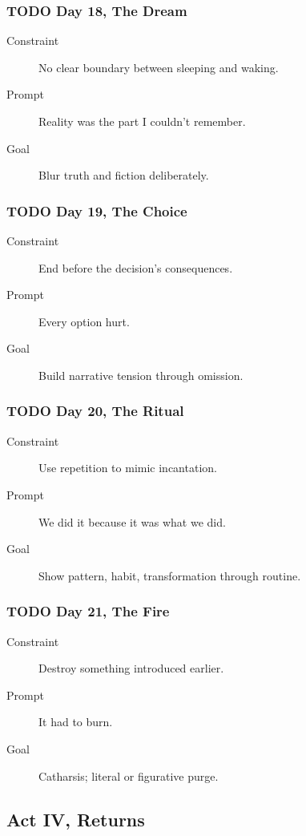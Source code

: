 \documentclass[11pt]{article}
\begin{document}
\subsubsection*{{\bfseries\sffamily TODO} Day 18, The Dream}
\label{sec:org8f648e4}
\begin{description}
\item[{Constraint}] No clear boundary between sleeping and waking.
\item[{Prompt}] Reality was the part I couldn’t remember.
\item[{Goal}] Blur truth and fiction deliberately.
\end{description}
\subsubsection*{{\bfseries\sffamily TODO} Day 19, The Choice}
\label{sec:org90b3529}
\begin{description}
\item[{Constraint}] End before the decision’s consequences.
\item[{Prompt}] Every option hurt.
\item[{Goal}] Build narrative tension through omission.
\end{description}
\subsubsection*{{\bfseries\sffamily TODO} Day 20, The Ritual}
\label{sec:org96d0e49}
\begin{description}
\item[{Constraint}] Use repetition to mimic incantation.
\item[{Prompt}] We did it because it was what we did.
\item[{Goal}] Show pattern, habit, transformation through routine.
\end{description}
\subsubsection*{{\bfseries\sffamily TODO} Day 21, The Fire}
\label{sec:orgb6f3f8d}
\begin{description}
\item[{Constraint}] Destroy something introduced earlier.
\item[{Prompt}] It had to burn.
\item[{Goal}] Catharsis; literal or figurative purge.
\end{description}
\subsection*{Act IV, Returns}
\label{sec:orgefa38c8}
\end{document}
